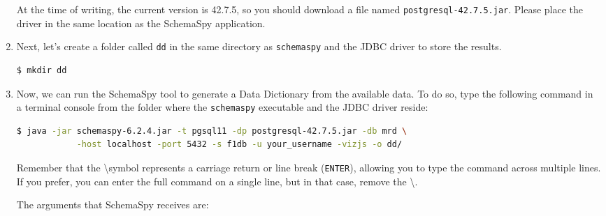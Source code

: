 \documentclass{article}
\begin{document}
\begin{enumerate}
    At the time of writing, the current version is 42.7.5, so you should download a file named \texttt{postgresql-42.7.5.jar}. Please place the driver in the same location as the SchemaSpy application.

    \item Next, let's create a folder called \texttt{dd} in the same directory as \texttt{schemaspy} and the JDBC driver to store the results.

    \begin{lstlisting}[language=bash]
    $ mkdir dd
    \end{lstlisting}

    \item Now, we can run the SchemaSpy tool to generate a Data Dictionary from the available data. To do so, type the following command in a terminal console from the folder where the \texttt{schemaspy} executable and the JDBC driver reside:

    \begin{lstlisting}[language=bash]
    $ java -jar schemaspy-6.2.4.jar -t pgsql11 -dp postgresql-42.7.5.jar -db mrd \
            -host localhost -port 5432 -s f1db -u your_username -vizjs -o dd/
    \end{lstlisting}

    Remember that the \textbackslash symbol represents a carriage return or line break (\texttt{ENTER}), allowing you to type the command across multiple lines. If you prefer, you can enter the full command on a single line, but in that case, remove the \textbackslash.

    The arguments that SchemaSpy receives are:


\end{enumerate}
\end{document}
